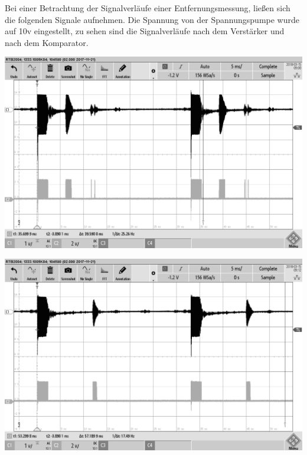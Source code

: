 Bei einer Betrachtung der Signalverläufe einer Entfernungsmessung, ließen sich die folgenden Signale aufnehmen. Die Spannung von der Spannungspumpe wurde auf 10v eingestellt, zu sehen sind die Signalverläufe nach dem Verstärker und nach dem Komparator.\\
\begin{minipage}{0.5\textwidth}
\includegraphics[width=1\textwidth%
]{Abbildungen/MessungenP2/10V/1m.png}
\label{fig:EKULIT 1m}
\end{minipage}
\begin{minipage}{0.5\textwidth}
\includegraphics[width=1\textwidth%
]{Abbildungen/MessungenP2/10V/2m.png}
\label{fig:EKULIT 2m}
\end{minipage}
